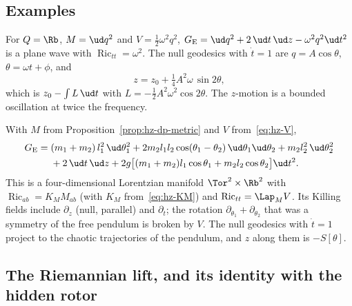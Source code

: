 \subsection{Examples}

\begin{example}\label{ex:hz-eis-ho}
For $Q=\Rb$, $M=\ud q^2$ and $V=\tfrac12\omega^2q^2$,
$G_{\rm E}=\ud q^2+2\,\ud t\,\ud z-\omega^2q^2\ud t^2$ is a plane wave with $\operatorname{Ric}_{tt}=\omega^2$.
The null geodesics with $\dot t=1$ are $q=A\cos\theta$, $\theta=\omega t+\phi$, and
\[
  z=z_0+\tfrac14A^2\omega\,\sin2\theta ,
\]
which is $z_0-\int L\,\ud t$ with $L=-\tfrac12A^2\omega^2\cos2\theta$. The $z$-motion is a
bounded oscillation at twice the frequency.
\end{example}

\begin{example}\label{ex:hz-eis-dp}
With $M$ from Proposition~\ref{prop:hz-dp-metric} and $V$ from~\eqref{eq:hz-V},
\[
\begin{aligned}
  G_{\rm E}={}&(m_1+m_2)\,l_1^2\,\ud\theta_1^2+2m_2l_1l_2\cos(\theta_1-\theta_2)\,\ud\theta_1\ud\theta_2
  +m_2l_2^2\,\ud\theta_2^2\\
  &+2\,\ud t\,\ud z+2g\bigl[(m_1+m_2)l_1\cos\theta_1+m_2l_2\cos\theta_2\bigr]\ud t^2 .
\end{aligned}
\]
This is a four-dimensional Lorentzian manifold $\Tor^2\times\Rb^2$ with
$\operatorname{Ric}_{ab}=K_MM_{ab}$ (with $K_M$ from~\eqref{eq:hz-KM}) and $\operatorname{Ric}_{tt}=\Lap_MV$.
Its Killing fields include $\partial_z$ (null, parallel) and $\partial_t$; the rotation
$\partial_{\theta_1}+\partial_{\theta_2}$ that was a symmetry of the free pendulum is
broken by $V$. The null geodesics with $\dot t=1$ project to the chaotic trajectories of the pendulum,
and $z$ along them is $-S[\theta]$.
\end{example}

\subsection{The Riemannian lift, and its identity with the hidden rotor}

